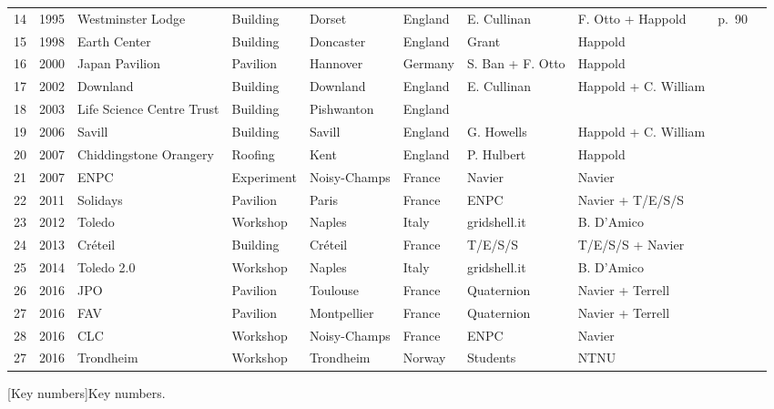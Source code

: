 \begin{landscape}
\begin{table}[p]
\begin{tabular}{@{}llll  lllllr@{}}
14 & 1995 & Westminster Lodge & Building & Dorset & England & E. Cullinan & F. Otto + Happold & p.~90 & \cite{Burton1998}\\
15 & 1998 & Earth Center & Building & Doncaster & England & Grant & Happold &  & \\
16 & 2000 & Japan Pavilion & Pavilion & Hannover & Germany & S. Ban + F. Otto & Happold &  & \cite{Ban2006}\\
17 & 2002 & Downland & Building & Downland & England & E. Cullinan & Happold + C. William &  & \cite{Harris2003}\\
18 & 2003 & Life Science Centre Trust & Building & Pishwanton & England &  &  &  & \\
19 & 2006 & Savill & Building & Savill & England & G. Howells & Happold + C. William &  & \cite{Harris2008}\\
20 & 2007 & Chiddingstone Orangery & Roofing & Kent & England & P. Hulbert & Happold &  & \\
21 & 2007 & ENPC & Experiment & Noisy-Champs & France & Navier & Navier &  & \cite{Douthe2006}\\
22 & 2011 & Solidays & Pavilion & Paris & France & ENPC & Navier + T/E/S/S &  & \cite{Baverel2012}\\
23 & 2012 & Toledo & Workshop & Naples & Italy & gridshell.it & B. D'Amico &  & \cite{DAmico2014}\\
24 & 2013 & Créteil & Building & Créteil & France & T/E/S/S & T/E/S/S + Navier &  & \cite{DuPeloux2016}\\
25 & 2014 & Toledo 2.0 & Workshop & Naples & Italy & gridshell.it & B. D'Amico &  & \cite{DAmico2015a}\\
26 & 2016 & JPO & Pavilion & Toulouse & France & Quaternion & Navier + Terrell &  & \\
27 & 2016 & FAV & Pavilion & Montpellier & France & Quaternion & Navier + Terrell &  & \\
28 & 2016 & CLC & Workshop & Noisy-Champs & France & ENPC & Navier &  & \\
27 & 2016 & Trondheim & Workshop & Trondheim & Norway & Students & NTNU &  & \cite{Mork2016}\\
 	\end{tabular}
[Key numbers]{Key numbers.}
\end{table}
\end{landscape}%


\clearpage

